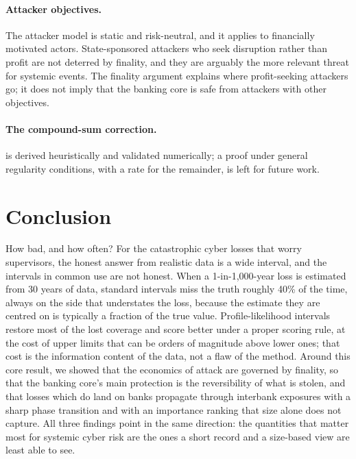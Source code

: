 \paragraph{Attacker objectives.} The attacker model is static and risk-neutral, and it applies to financially motivated actors. State-sponsored attackers who seek disruption rather than profit are not deterred by finality, and they are arguably the more relevant threat for systemic events. The finality argument explains where profit-seeking attackers go; it does not imply that the banking core is safe from attackers with other objectives.

\paragraph{The compound-sum correction.}  is derived heuristically and validated numerically; a proof under general regularity conditions, with a rate for the remainder, is left for future work.

\section{Conclusion}\label{sec:conclusion}

How bad, and how often? For the catastrophic cyber losses that worry supervisors, the honest answer from realistic data is a wide interval, and the intervals in common use are not honest. When a 1-in-1,000-year loss is estimated from 30 years of data, standard intervals miss the truth roughly 40\% of the time, always on the side that understates the loss, because the estimate they are centred on is typically a fraction of the true value. Profile-likelihood intervals restore most of the lost coverage and score better under a proper scoring rule, at the cost of upper limits that can be orders of magnitude above lower ones; that cost is the information content of the data, not a flaw of the method. Around this core result, we showed that the economics of attack are governed by finality, so that the banking core's main protection is the reversibility of what is stolen, and that losses which do land on banks propagate through interbank exposures with a sharp phase transition and with an importance ranking that size alone does not capture. All three findings point in the same direction: the quantities that matter most for systemic cyber risk are the ones a short record and a size-based view are least able to see.
